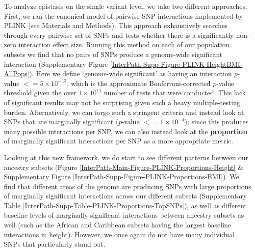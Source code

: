 \documentclass[12pt,a4paper]{article}
\begin{document}
To analyze epistasis on the single variant level, we take two different approaches. First, we ran the canonical model of pairwise SNP interactions implemented by PLINK (see Materials and Methods). This approach exhaustively searches through every pairwise set of SNPs and tests whether there is a significantly non-zero interaction effect size. Running this method on each of our population subsets we find that no pairs of SNPs produce a genome-wide significant interaction (Supplementary Figure \ref{InterPath-Supp-Figure-PLINK-HeightBMI-AllPops}). Here we define `genome-wide significant' as having an interaction $p$-value $<= 5\times10^{-13}$, which is the approximate Bonferroni-corrected $p$-value threshold given the over $1\times10^{11}$ number of tests that were conducted. This lack of significant results may not be surprising given such a heavy multiple-testing burden. Alternatively, we can forgo such a stringent criteria and instead look at SNPs that are marginally significant ($p$-value $<= 1\times10^{-4}$); since this produces many possible interactions per SNP, we can also instead look at the \textbf{proportion} of marginally significant interactions per SNP as a more appropriate metric.  

Looking at this new framework, we do start to see different patterns between our ancestry subsets (Figure \ref{InterPath-Main-Figure-PLINK-Proportions-Height} \& Supplementary Figure \ref{InterPath-Supp-Figure-PLINK-Proportions-BMI}). We find that different areas of the genome are producing SNPs with large proportions of marginally significant interactions across our different subsets (Supplementary Table \ref{InterPath-Supp-Table-PLINK-Proportions-TopSNPs}), as well as different baseline levels of marginally significant interactions between ancestry subsets as well (such as the African and Caribbean subsets having the largest baseline interactions in height). However, we once again do not have many individual SNPs that particularly stand out. 
\end{document}
